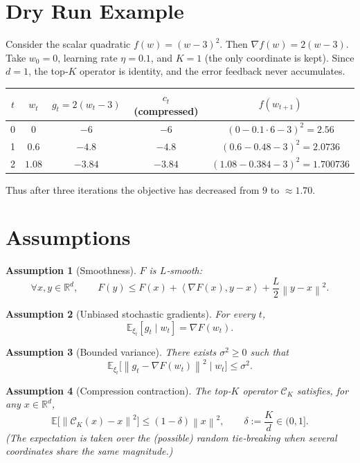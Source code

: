 \documentclass{article}
\newtheorem{assumption}{Assumption}
\newcommand{\E}{\mathbb{E}}
\newcommand{\R}{\mathbb{R}}
\newcommand{\norm}[1]{\left\lVert #1 \right\rVert}
\newcommand{\inner}[2]{\left\langle #1,#2 \right\rangle}
\newcommand{\topk}{\mathcal{C}_K}
\begin{document}
\section*{Dry Run Example}
Consider the scalar quadratic $f(w)=(w-3)^2$.
Then $\nabla f(w)=2(w-3)$.  
Take $w_0=0$, learning rate $\eta=0.1$, and $K=1$ (the only coordinate is kept).  
Since $d=1$, the top‑$K$ operator is identity, and the error feedback never accumulates.

\begin{center}
\begin{tabular}{c|c|c|c|c}
$t$ & $w_t$ & $g_t=2(w_t-3)$ & $c_t$ (compressed) & $f(w_{t+1})$\\\hline
0 & $0$   & $-6$ & $-6$ & $(0-0.1\cdot6-3)^2=2.56$\\
1 & $0.6$ & $-4.8$ & $-4.8$ & $(0.6-0.48-3)^2=2.0736$\\
2 & $1.08$& $-3.84$& $-3.84$& $(1.08-0.384-3)^2=1.700736$
\end{tabular}
\end{center}
Thus after three iterations the objective has decreased from $9$ to $\approx1.70$.

\newpage
\section*{Assumptions}
\begin{assumption}[Smoothness]\label{ass:smooth}
$F$ is $L$‑smooth:
\[
\forall x,y\in\R^d,\qquad 
F(y)\le F(x)+\inner{\nabla F(x)}{y-x}+\frac{L}{2}\norm{y-x}^2 .
\]
\end{assumption}
\begin{assumption}[Unbiased stochastic gradients]\label{ass:unbiased}
For every $t$,
\[
\E_{\xi_t}[g_t\mid w_t]=\nabla F(w_t).
\]
\end{assumption}
\begin{assumption}[Bounded variance]\label{ass:variance}
There exists $\sigma^2\ge0$ such that
\[
\E_{\xi_t}\!\big[\norm{g_t-\nabla F(w_t)}^2\mid w_t\big]\le\sigma^2 .
\]
\end{assumption}
\begin{assumption}[Compression contraction]\label{ass:compress}
The top‑$K$ operator $\topk$ satisfies, for any $x\in\R^{d}$,
\[
\E\!\big[\norm{\topk(x)-x}^2\big]\le (1-\delta)\norm{x}^2,
\qquad \delta:=\frac{K}{d}\in(0,1].
\]
(The expectation is taken over the (possible) random tie‑breaking when several coordinates share the same magnitude.)
\end{assumption}
\end{document}
